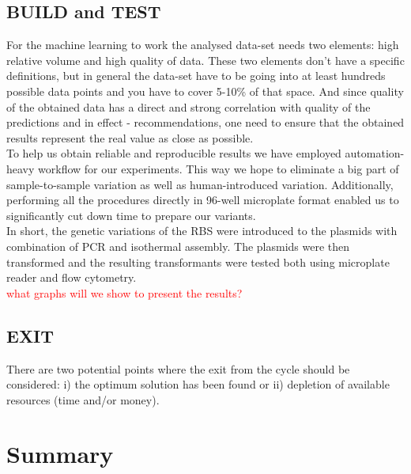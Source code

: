 \documentclass{article}
\begin{document}
\subsection{BUILD and TEST}

For the machine learning to work the analysed data-set needs two elements: high relative volume and high quality of data. These two elements don't have a specific definitions, but in general the data-set have to be going into at least hundreds possible data points and you have to cover 5-10\% of that space. And since quality of the obtained data has a direct and strong correlation with quality of the predictions and in effect - recommendations, one need to ensure that the obtained results represent the real value as close as possible.\\
To help us obtain reliable and reproducible results we have employed automation-heavy workflow for our experiments. This way we hope to eliminate a big part of sample-to-sample variation as well as human-introduced variation. Additionally, performing all the procedures directly in 96-well microplate format enabled us to significantly cut down time to prepare our variants.\\
In short, the genetic variations of the RBS were introduced to the plasmids with combination of PCR and isothermal assembly. The plasmids were then transformed and the resulting transformants were tested both using microplate reader and flow cytometry.\\

\textcolor{red}{what graphs will we show to present the results?}



\subsection{EXIT}
There are two potential points where the exit from the cycle should be considered: i) the optimum solution has been found or ii) depletion of available resources (time and/or money).


\section{Summary}

\newpage

\printbibliography

\clearpage

\appendix

\end{document}
